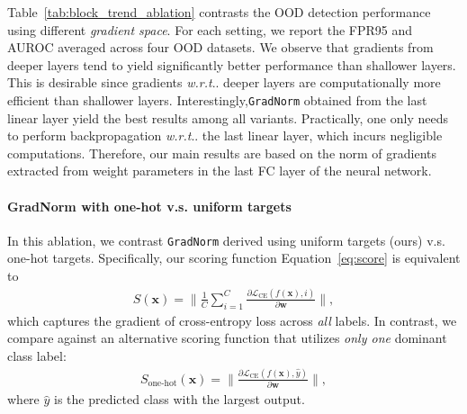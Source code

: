 \documentclass{article}
\makeatletter
\def\*#1{\mathbf{#1}}
\DeclareRobustCommand\onedot{\futurelet\@let@token\@onedot}
\def\@onedot{\ifx\@let@token.\else.\null\fi\xspace}
\def\wrt{\emph{w.r.t}\onedot} \def\dof{d.o.f\onedot}
\makeatother
\begin{document}
Table~\ref{tab:block_trend_ablation} contrasts the OOD detection performance using different \emph{gradient space}. For each setting, we report the FPR95 and AUROC averaged across four OOD datasets. We observe that gradients from deeper layers tend to yield significantly better performance than shallower layers. This is desirable since gradients \wrt deeper layers are computationally more efficient than shallower layers. Interestingly,\texttt{GradNorm} obtained from the last linear layer yield the best results among all variants. Practically, one only needs to perform backpropagation \wrt the last linear layer, which incurs negligible computations. Therefore, our main results are based on the norm of gradients extracted from weight parameters in the last FC layer of the neural network. 


























\vspace{-0.2cm}
\paragraph{{GradNorm} with one-hot v.s. uniform targets}



In this ablation, we contrast \texttt{GradNorm} derived using uniform targets (ours) v.s. one-hot targets. Specifically, our scoring function Equation~\ref{eq:score}  is equivalent to 
\begin{align}
    S(\*x) = \lVert \frac{1}{C}\sum_{i=1}^C \frac{\partial \mathcal{L}_\text{CE}(f(\*x),i)}{\partial \*w} \rVert,
\end{align}
which captures the gradient of cross-entropy loss across \emph{all} labels. In contrast, we compare against an alternative scoring function that utilizes \emph{only one} dominant class label:
\begin{align}
    S_\text{one-hot}(\*x) = \lVert \frac{\partial \mathcal{L}_\text{CE}(f(\*x),\hat y)}{\partial \*w} \rVert,
\end{align}
where $\hat y$ is the predicted class with the largest output. 
\end{document}
